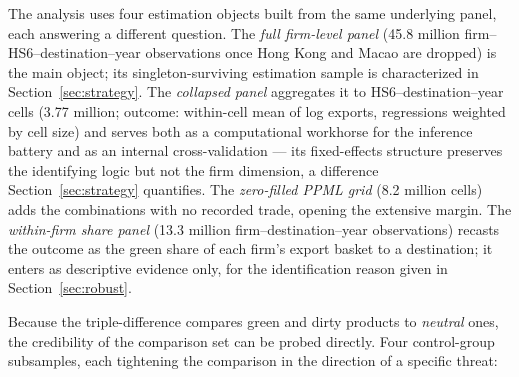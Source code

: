 \documentclass[12pt]{article}
\begin{document}
The analysis uses four estimation objects built from the same underlying panel, each
answering a different question. The \emph{full firm-level panel} (45.8 million
firm--HS6--destination--year observations once Hong Kong and Macao are dropped) is the
main object; its singleton-surviving estimation sample is characterized in
Section~\ref{sec:strategy}. The \emph{collapsed panel} aggregates it to
HS6--destination--year cells (3.77 million; outcome: within-cell mean of log exports,
regressions weighted by cell size) and serves both as a computational workhorse for
the inference battery and as an internal cross-validation --- its fixed-effects
structure preserves the identifying logic but not the firm dimension, a difference
Section~\ref{sec:strategy} quantifies. The \emph{zero-filled
PPML grid} (8.2 million cells) adds the combinations with no recorded trade, opening
the extensive margin. The \emph{within-firm share panel} (13.3 million
firm--destination--year observations) recasts the outcome as the green share of each
firm's export basket to a destination; it enters as descriptive evidence only, for the
identification reason given in Section~\ref{sec:robust}.

Because the triple-difference compares green and dirty products to \emph{neutral}
ones, the credibility of the comparison set can be probed directly. Four
control-group subsamples, each tightening the comparison in the
direction of a specific threat:
\end{document}
